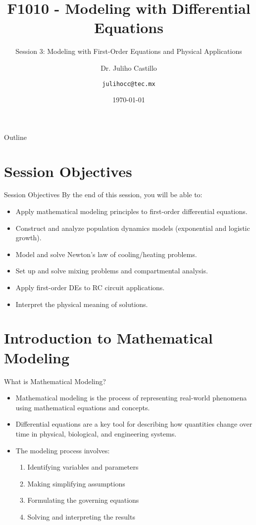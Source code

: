 \documentclass[10pt,aspectratio=169]{beamer}
\title{F1010 - Modeling with Differential Equations}
\subtitle{Session 3: Modeling with First-Order Equations and Physical Applications}
\author{Dr. Juliho Castillo \and \texttt{julihocc@tec.mx}}
\institute{Tec de Monterrey}
\date{\today}
\begin{document}
\maketitle

\begin{frame}{Outline}
    \tableofcontents
\end{frame}

\section{Session Objectives}
\begin{frame}{Session Objectives}
    By the end of this session, you will be able to:
    \begin{itemize}
        \item Apply mathematical modeling principles to first-order differential equations.
        \item Construct and analyze population dynamics models (exponential and logistic growth).
        \item Model and solve Newton's law of cooling/heating problems.
        \item Set up and solve mixing problems and compartmental analysis.
        \item Apply first-order DEs to RC circuit applications.
        \item Interpret the physical meaning of solutions.
    \end{itemize}
\end{frame}

\section{Introduction to Mathematical Modeling}
\begin{frame}{What is Mathematical Modeling?}
    \begin{itemize}
        \item Mathematical modeling is the process of representing real-world phenomena using mathematical equations and concepts.
        \item Differential equations are a key tool for describing how quantities change over time in physical, biological, and engineering systems.
        \item The modeling process involves:
        \begin{enumerate}
            \item Identifying variables and parameters
            \item Making simplifying assumptions
            \item Formulating the governing equations
            \item Solving and interpreting the results
        \end{enumerate}
    \end{itemize}
\end{frame}
\end{document}
